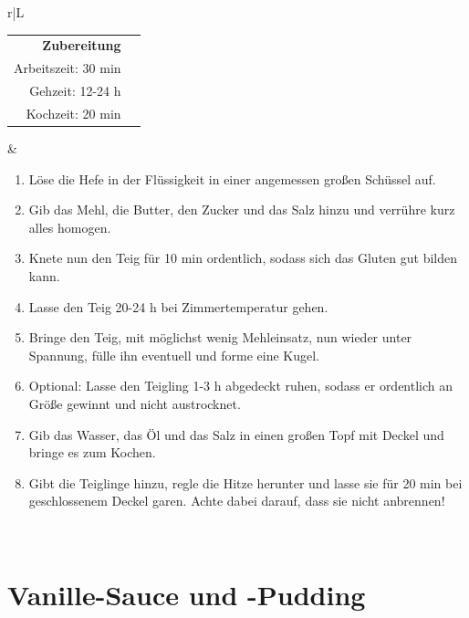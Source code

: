 \documentclass[a4paper, 12pt]{scrbook} 								%
\numberwithin{equation}{section} 									%
\begin{document}
		\begin{tabularx}{\textwidth}{r|L}
			\begin{tabular}[t]{rr}
				\textbf{Zubereitung}	\\
				Arbeitszeit: 30 min	\\
				Gehzeit: 12-24 h \\
				Kochzeit: 20 min \\
			\end{tabular}			&	\begin{enumerate}[]
											\item Löse die Hefe in der Flüssigkeit in einer angemessen großen Schüssel auf.
											\item Gib das Mehl, die Butter, den Zucker und das Salz hinzu und verrühre kurz alles homogen.
											\item Knete nun den Teig für 10 min ordentlich, sodass sich das Gluten gut bilden kann.
											\item Lasse den Teig 20-24 h bei Zimmertemperatur gehen.
											\item Bringe den Teig, mit möglichst wenig Mehleinsatz, nun wieder unter Spannung, fülle ihn eventuell und forme eine Kugel.
											\item Optional: Lasse den Teigling 1-3 h abgedeckt ruhen, sodass er ordentlich an Größe gewinnt und nicht austrocknet.
											\item Gib das Wasser, das Öl und das Salz in einen großen Topf mit Deckel und bringe es zum Kochen.
											\item Gibt die Teiglinge hinzu, regle die Hitze herunter und lasse sie für 20 min bei geschlossenem Deckel garen. Achte dabei darauf, dass sie nicht anbrennen!
										\end{enumerate}	\\
		\end{tabularx}
		\newpage


		\section{Vanille-Sauce und -Pudding}	\label{vanillesosse}
\end{document}
